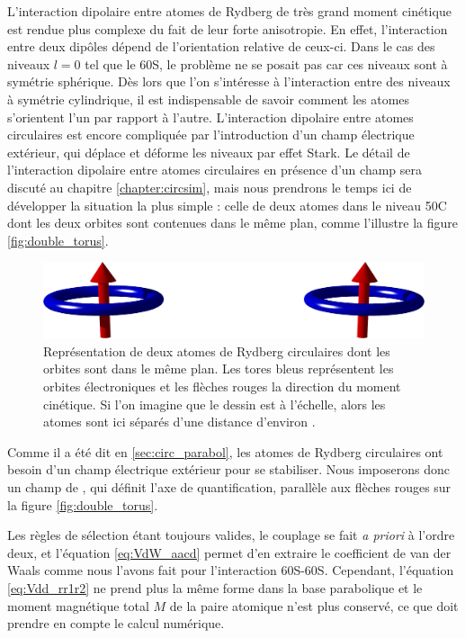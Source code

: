 \noindent L'interaction dipolaire entre atomes de Rydberg de très grand moment cinétique est rendue plus complexe du fait de leur forte anisotropie.
En effet, l'interaction entre deux dipôles dépend de l'orientation relative de ceux-ci.
Dans le cas des niveaux $l=0$ tel que le 60S, le problème ne se posait pas car ces niveaux sont à symétrie sphérique.
Dès lors que l'on s'intéresse à l'interaction entre des niveaux à symétrie cylindrique, il est indispensable de savoir comment les atomes s'orientent l'un par rapport à l'autre.
L'interaction dipolaire entre atomes circulaires est encore compliquée par l'introduction d'un champ électrique extérieur, qui déplace et déforme les niveaux par effet Stark.
Le détail de l'interaction dipolaire entre atomes circulaires en présence d'un champ sera discuté au chapitre \ref{chapter:circsim}, mais nous prendrons le temps ici de développer la situation la plus simple :
celle de deux atomes dans le niveau 50C dont les deux orbites sont contenues dans le même plan, comme l'illustre la figure \eqref{fig:double_torus}.
%
\begin{figure}[!h]
\centering
\vspace{1em}
\includegraphics[width=.8\linewidth]{figures/theory/double_torus.png}
\caption[Deux atomes circulaires côte à côte]{Représentation de deux atomes de Rydberg circulaires dont les orbites sont dans le même plan.
Les tores bleus représentent les orbites électroniques et les flèches rouges la direction du moment cinétique.
Si l'on imagine que le dessin est à l'échelle, alors les atomes sont ici séparés d'une distance d'environ .}
\label{fig:double_torus}
\end{figure}
%
Comme il a été dit en \ref{sec:circ_parabol}, les atomes de Rydberg circulaires ont besoin d'un champ électrique extérieur pour se stabiliser.
Nous imposerons donc un champ de , qui définit l'axe de quantification, parallèle aux flèches rouges sur la figure \eqref{fig:double_torus}.

Les règles de sélection étant toujours valides, le couplage se fait \textit{a priori} à l'ordre deux, et l'équation \eqref{eq:VdW_aacd} permet d'en extraire le coefficient de van der Waals comme nous l'avons fait pour l'interaction 60S-60S.
Cependant, l'équation \eqref{eq:Vdd_rr1r2} ne prend plus la même forme dans la base parabolique et le moment magnétique total $M$ de la paire atomique n'est plus conservé, ce que doit prendre en compte le calcul numérique.

